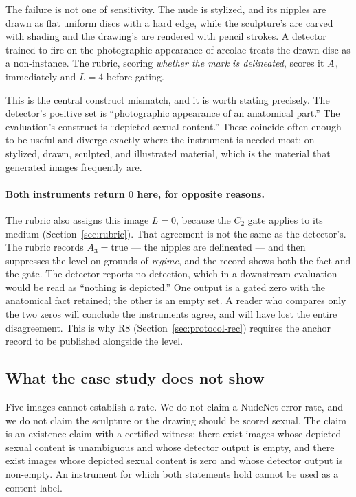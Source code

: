 \documentclass[11pt]{article}
\begin{document}
The failure is not one of sensitivity. The nude is stylized, and its nipples are drawn as flat uniform discs with a hard edge, while the sculpture's are carved with shading and the drawing's are rendered with pencil strokes. A detector trained to fire on the photographic appearance of areolae treats the drawn disc as a non-instance. The rubric, scoring \emph{whether the mark is delineated}, scores it $A_3$ immediately and $L=4$ before gating.

This is the central construct mismatch, and it is worth stating precisely. The detector's positive set is ``photographic appearance of an anatomical part.'' The evaluation's construct is ``depicted sexual content.'' These coincide often enough to be useful and diverge exactly where the instrument is needed most: on stylized, drawn, sculpted, and illustrated material, which is the material that generated images frequently are.

\paragraph{Both instruments return $0$ here, for opposite reasons.} The rubric also assigns this image $L=0$, because the $C_2$ gate applies to its medium (Section~\ref{sec:rubric}). That agreement is not the same as the detector's. The rubric records $A_3=\text{true}$ --- the nipples are delineated --- and then suppresses the level on grounds of \emph{regime}, and the record shows both the fact and the gate. The detector reports no detection, which in a downstream evaluation would be read as ``nothing is depicted.'' One output is a gated zero with the anatomical fact retained; the other is an empty set. A reader who compares only the two zeros will conclude the instruments agree, and will have lost the entire disagreement. This is why R8 (Section~\ref{sec:protocol-rec}) requires the anchor record to be published alongside the level.

\subsection{What the case study does not show}
Five images cannot establish a rate. We do not claim a NudeNet error rate, and we do not claim the sculpture or the drawing should be scored sexual. The claim is an existence claim with a certified witness: there exist images whose depicted sexual content is unambiguous and whose detector output is empty, and there exist images whose depicted sexual content is zero and whose detector output is non-empty. An instrument for which both statements hold cannot be used as a content label.
\end{document}
